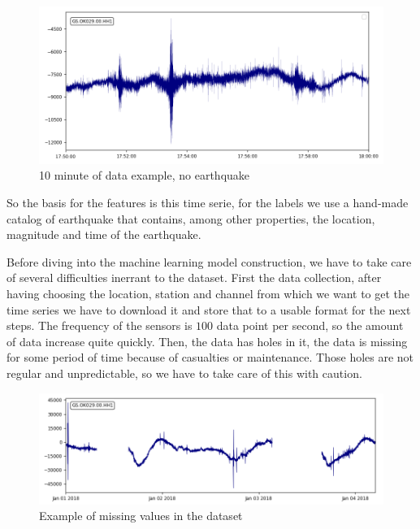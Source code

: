 \documentclass[10pt,conference,compsocconf]{IEEEtran}
\begin{document}
\begin{figure}[h]
  \centering
	\includegraphics[width=\columnwidth]{../processed-data/10min-example-2018-06-30T17:50.png}
  \caption{10 minute of data example, no earthquake}
	\label{fig:10min-example}
\end{figure}

So the basis for the features is this time serie, for the labels we use a hand-made catalog of earthquake that contains, among other properties, the location, magnitude and time of the earthquake.\newline \newline


Before diving into the machine learning model construction, we have to take care of several difficulties inerrant to the dataset.\newline
First the data collection, after having choosing the location, station and channel from which we want to get the time series we have to download it and store that to a usable format for the next steps. The frequency of the sensors is $100$ data point per second, so the amount of data increase quite quickly. Then, the data has holes in it, the data is missing for some period of time because of casualties or maintenance. Those holes are not regular and unpredictable, so we have to take care of this with caution.

\begin{figure}[h]
  \centering
	\includegraphics[width=\columnwidth]{../processed-data/hole_example.png}
  \caption{Example of missing values in the dataset}
	\label{fig:10min-example}
\end{figure}
\end{document}
